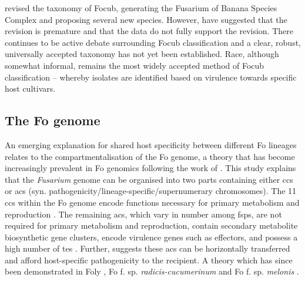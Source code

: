 \textcite{Maryani2019} revised the taxonomy of \ac{Focub}, generating the Fusarium of Banana Species Complex and proposing several new species. However, \textcite{Torres2021} have suggested that the revision is premature and that the data do not fully support the revision. There continues to be active debate surrounding \ac{Focub} classification and a clear, robust, universally accepted taxonomy has not yet been established. Race, although somewhat informal, remains the most widely accepted method of \ac{Focub} classification – whereby isolates are identified based on virulence towards specific host cultivars.  

\afterpage{



\clearpage
}

\subsection{The \acl{Fo} genome} 

An emerging explanation for shared host specificity between different \acf{Fo} lineages relates to the compartmentalisation of the \ac{Fo} genome, a theory that has become increasingly prevalent in \ac{Fo} genomics following the work of \textcite{Ma2010}. This study explains that the \textit{Fusarium} genome can be organised into two parts containing either \acp{cc} or \acp{ac} (syn. pathogenicity/lineage-specific/supern\-umerary chromosomes). The 11 \acp{cc} within the \ac{Fo} genome encode functions necessary for primary metabolism and reproduction \parencite{Dam2017}. The remaining \acp{ac}, which vary in number among \acp{fsp}, are not required for primary metabolism and reproduction, contain secondary metabolite biosynthetic gene clusters, encode virulence genes such as effectors, and possess a high number of \acp{te} \parencite{Ma2010, Schmidt2013, Witte2021}. Further, \textcite{Ma2010} suggests these \acp{ac} can be horizontally transferred and afford host-specific pathogenicity to the recipient. A theory which has since been demonstrated in \ac{Foly} \parencite{Vlaardingerbroek2016a, Vlaardingerbroek2016b, Li2020a}, \ac{Fo} f. sp. \textit{radicis-cucumerinum} \parencite{Dam2017} and \ac{Fo} f. sp.  \textit{melonis} \parencite{Li2020b}. 
 
